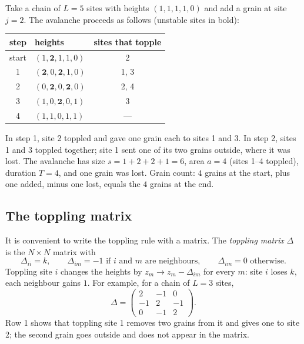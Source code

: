 \begin{example}
\label{ex:avalanche}
Take a chain of $L=5$ sites with heights $(1,1,1,1,0)$ and add a grain at site $j=2$. The avalanche proceeds as
follows (unstable sites in bold):
\begin{center}
\begin{tabular}{clc}
\toprule
step & heights & sites that topple \\
\midrule
start & $(1,\mathbf{2},1,1,0)$ & 2 \\
1 & $(\mathbf{2},0,\mathbf{2},1,0)$ & 1, 3 \\
2 & $(0,\mathbf{2},0,\mathbf{2},0)$ & 2, 4 \\
3 & $(1,0,\mathbf{2},0,1)$ & 3 \\
4 & $(1,1,0,1,1)$ & --- \\
\bottomrule
\end{tabular}
\end{center}
In step 1, site 2 toppled and gave one grain each to sites 1 and 3. In step 2, sites 1 and 3 toppled together;
site 1 sent one of its two grains outside, where it was lost. The avalanche has size $s = 1+2+2+1 = 6$, area $a=4$
(sites 1--4 toppled), duration $T=4$, and one grain was lost. Grain count: $4$ grains at the start, plus one added,
minus one lost, equals the $4$ grains at the end.
\end{example}

\subsection{The toppling matrix}

It is convenient to write the toppling rule with a matrix. The \emph{toppling matrix} $\Delta$ is the $N\times N$
matrix with
\begin{equation}
  \Delta_{ii} = k, \qquad \Delta_{im} = -1 \text{ if $i$ and $m$ are neighbours},\qquad \Delta_{im}=0 \text{ otherwise}.
\end{equation}
Toppling site $i$ changes the heights by $z_m \to z_m - \Delta_{im}$ for every $m$: site $i$ loses $k$, each
neighbour gains $1$. For example, for a chain of $L=3$ sites,
\begin{equation}
  \Delta = \begin{pmatrix} 2 & -1 & 0\\ -1 & 2 & -1 \\ 0 & -1 & 2 \end{pmatrix}.
  \label{eq:Delta3}
\end{equation}
Row 1 shows that toppling site 1 removes two grains from it and gives one to site 2; the second grain goes outside
and does not appear in the matrix.

